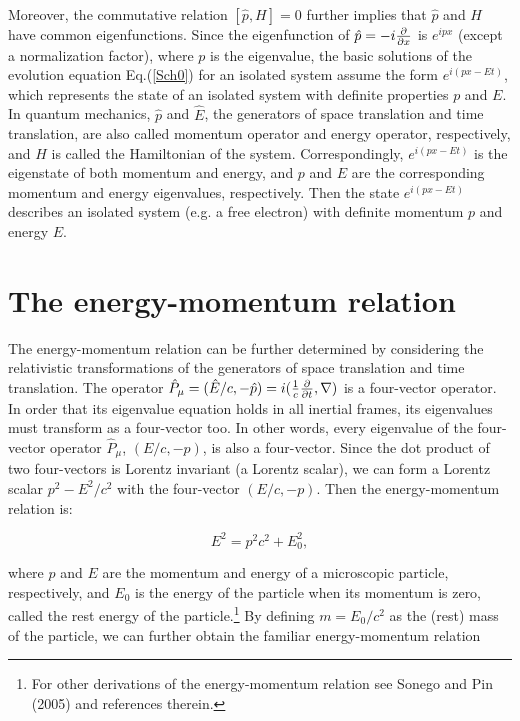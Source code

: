 \noindent Moreover, the commutative relation $[\hat{p},H]=0$ further implies that $\hat{p}$ and $H$ have common eigenfunctions. Since the eigenfunction of $\hat{p} = -i{ \partial \over \partial x}$ is $e^{ipx}$ (except a normalization factor),
where $p$ is the eigenvalue, the basic solutions of the evolution equation Eq.(\ref{Sch0}) for an isolated system assume the form $e^{i(px-Et)}$, which represents the state of an isolated system with definite properties $p$ and $E$. 
In quantum mechanics, $\hat{p}$ and $\hat{E}$, the generators of space translation and time translation, are also called momentum operator and energy operator, respectively, and $H$ is called the Hamiltonian of the system. Correspondingly, $e^{i(px-Et)}$ is the eigenstate of both momentum and energy, and $p$ and $E$ are the corresponding momentum and energy eigenvalues, respectively. Then the state $e^{i(px-Et)}$ describes an isolated system (e.g. a free electron) with definite momentum $p$ and energy $E$.

\section{The energy-momentum relation}

The  energy-momentum relation can be further determined by considering the relativistic transformations of the generators of space translation and time translation. The operator $\hat{P}_{\mu}=(\hat{E}/c, -\hat{{p}})=i({1 \over c}{\partial \over \partial t}, \nabla)$ is a four-vector operator. In order that its eigenvalue equation holds in all inertial frames, its eigenvalues must transform as a four-vector too. In other words,  every eigenvalue of the four-vector operator $\hat{P}_{\mu}$, $(E/c, -{p})$, is also a four-vector. 
Since the dot product of two four-vectors is Lorentz invariant (a Lorentz scalar), we can form a Lorentz  scalar $p^2-E^2/c^2$ with the four-vector  $(E/c, -{p})$. Then the energy-momentum relation is:

\begin{equation}
E^2=p^2c^2+E_0^2,
\label{EM1}
\end{equation}

\noindent where $p$ and $E$ are the momentum and energy of a microscopic particle, respectively, and $E_0$ is the energy of the particle when its momentum is zero, called the rest energy of the particle.\footnote{For other derivations of the energy-momentum relation see Sonego and Pin (2005) and references therein.} By defining $m=E_0/c^2$ as the (rest) mass of the particle, we can further obtain the familiar energy-momentum relation

